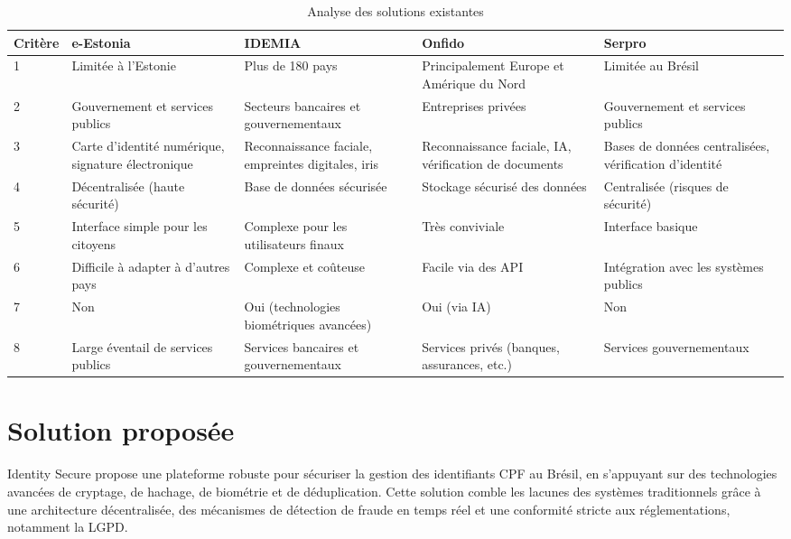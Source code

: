 \begin{table}[H]
\centering
\caption{\centering Analyse des solutions existantes}
\label{tab:analyse-solutions}
\begin{tabular}{|p{1.8cm}|p{3cm}|p{3cm}|p{3cm}|p{3cm}|}
\hline
\rowcolor{gray!30} %
\textbf{Critère} & \textbf{e-Estonia} & \textbf{IDEMIA} & \textbf{Onfido} & \textbf{Serpro} \\
\hline
1 & Limitée à l'Estonie & Plus de 180 pays & Principalement Europe et Amérique du Nord & Limitée au Brésil \\
\hline
2 & Gouvernement et services publics & Secteurs bancaires et gouvernementaux & Entreprises privées & Gouvernement et services publics \\
\hline
3 & Carte d'identité numérique, signature électronique & Reconnaissance faciale, empreintes digitales, iris & Reconnaissance faciale, IA, vérification de documents & Bases de données centralisées, vérification d'identité \\
\hline
4 & Décentralisée (haute sécurité) & Base de données sécurisée & Stockage sécurisé des données & Centralisée (risques de sécurité) \\
\hline
5 & Interface simple pour les citoyens & Complexe pour les utilisateurs finaux & Très conviviale & Interface basique \\
\hline
6 & Difficile à adapter à d'autres pays & Complexe et coûteuse & Facile via des API & Intégration avec les systèmes publics \\
\hline
7 & Non & Oui (technologies biométriques avancées) & Oui (via IA) & Non \\
\hline
8 & Large éventail de services publics & Services bancaires et gouvernementaux & Services privés (banques, assurances, etc.) & Services gouvernementaux \\
\hline
\end{tabular}
\end{table}


\section{Solution proposée}
Identity Secure propose une plateforme robuste pour sécuriser la gestion des identifiants CPF au Brésil, en s'appuyant sur des technologies avancées de cryptage, de hachage, de biométrie et de déduplication. Cette solution comble les lacunes des systèmes traditionnels grâce à une architecture décentralisée, des mécanismes de détection de fraude en temps réel et une conformité stricte aux réglementations, notamment la LGPD.

